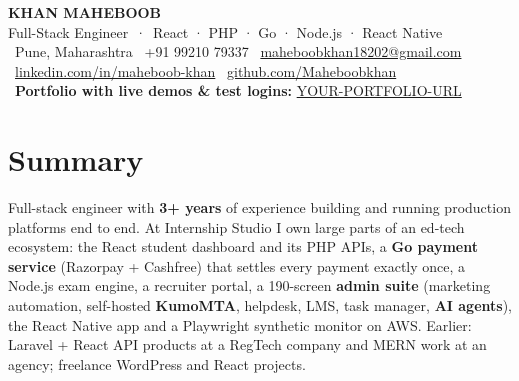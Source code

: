 \documentclass[10pt,a4paper]{article}
\newcommand{\link}[2]{\href{#1}{\color{teal}#2}}
\begin{document}
\begin{center}
  {\Huge\bfseries KHAN MAHEBOOB}\\[3pt]
  {\large\color{teal} Full-Stack Engineer \,·\, React · PHP · Go · Node.js · React Native}\\[5pt]
  {\small
  \faMapMarker*\ Pune, Maharashtra \quad
  \faPhone\ +91 99210 79337 \quad
  \faEnvelope\ \href{mailto:maheboobkhan18202@gmail.com}{maheboobkhan18202@gmail.com} \quad
  \faLinkedin\ \link{https://www.linkedin.com/in/maheboob-khan-b220b5246}{linkedin.com/in/maheboob-khan} \quad
  \faGithub\ \link{https://github.com/Maheboobkhan}{github.com/Maheboobkhan}}\\[3pt]
  {\small \faGlobe\ \textbf{Portfolio with live demos \& test logins:} \link{https://YOUR-PORTFOLIO-URL}{YOUR-PORTFOLIO-URL}}
\end{center}
\vspace{-6pt}

\section{Summary}
Full-stack engineer with \textbf{3+ years} of experience building and running production platforms end to end.
At Internship Studio I own large parts of an ed-tech ecosystem: the React student dashboard and its PHP APIs, a
\textbf{Go payment service} (Razorpay + Cashfree) that settles every payment exactly once, a Node.js exam engine,
a recruiter portal, a 190-screen \textbf{admin suite} (marketing automation, self-hosted \textbf{KumoMTA}, helpdesk,
LMS, task manager, \textbf{AI agents}), the React Native app and a Playwright synthetic monitor on AWS.
Earlier: Laravel + React API products at a RegTech company and MERN work at an agency; freelance WordPress and React projects.

\end{document}
